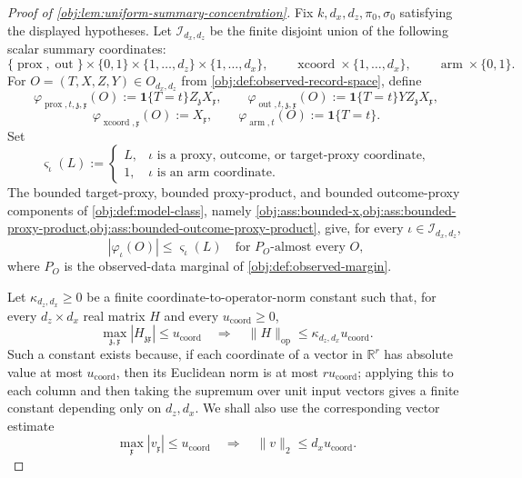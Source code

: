 \begin{proof}[Proof of \cref{obj:lem:uniform-summary-concentration}]
Fix \(k,d_x,d_z,\pi_0,\sigma_0\) satisfying the displayed hypotheses.  Let
\(\mathcal I_{d_x,d_z}\) be the finite disjoint union of the following scalar
summary coordinates:
\[
\{\operatorname{prox},\operatorname{out}\}\times\{0,1\}
\times\{1,\ldots,d_z\}\times\{1,\ldots,d_x\},
\qquad
\operatorname{xcoord}\times\{1,\ldots,d_x\},
\qquad
\operatorname{arm}\times\{0,1\}.
\]
For \(O=(T,X,Z,Y)\in O_{d_x,d_z}\) from
\cref{obj:def:observed-record-space}, define
\[
\varphi_{\operatorname{prox},t,\mathfrak z,\mathfrak x}(O)
:=
\mathbf 1\{T=t\}Z_{\mathfrak z}X_{\mathfrak x},
\qquad
\varphi_{\operatorname{out},t,\mathfrak z,\mathfrak x}(O)
:=
\mathbf 1\{T=t\}YZ_{\mathfrak z}X_{\mathfrak x},
\]
\[
\varphi_{\operatorname{xcoord},\mathfrak x}(O):=X_{\mathfrak x},
\qquad
\varphi_{\operatorname{arm},t}(O):=\mathbf 1\{T=t\}.
\]
Set
\[
\varsigma_{\iota}(L):=
\begin{cases}
L, & \iota\text{ is a proxy, outcome, or target-proxy coordinate},\\
1, & \iota\text{ is an arm coordinate}.
\end{cases}
\]
The bounded target-proxy, bounded proxy-product, and bounded outcome-proxy
components of \cref{obj:def:model-class}, namely
\cref{obj:ass:bounded-x,obj:ass:bounded-proxy-product,obj:ass:bounded-outcome-proxy-product},
give, for every \(\iota\in\mathcal I_{d_x,d_z}\),
\[
|\varphi_\iota(O)|\le \varsigma_\iota(L)
\quad\text{for \(P_O\)-almost every }O,
\]
where \(P_O\) is the observed-data marginal of
\cref{obj:def:observed-margin}.  %

Let \(\kappa_{d_z,d_x}\ge0\) be a finite coordinate-to-operator-norm constant
such that, for every \(d_z\times d_x\) real matrix \(H\) and every
\(u_{\mathrm{coord}}\ge0\),
\[
\max_{\mathfrak z,\mathfrak x}|H_{\mathfrak z\mathfrak x}|
\le u_{\mathrm{coord}}
\quad\Longrightarrow\quad
\|H\|_{\mathrm{op}}\le \kappa_{d_z,d_x}u_{\mathrm{coord}}.
\]
Such a constant exists because, if each coordinate of a vector in
\(\mathbb R^r\) has absolute value at most \(u_{\mathrm{coord}}\), then its
Euclidean norm is at most \(r u_{\mathrm{coord}}\); applying this to each
column and then taking the supremum over unit input vectors gives a finite
constant depending only on \(d_z,d_x\).  We shall also use the corresponding
vector estimate
\[
\max_{\mathfrak x}|v_{\mathfrak x}|\le u_{\mathrm{coord}}
\quad\Longrightarrow\quad
\|v\|_2\le d_xu_{\mathrm{coord}} .
\]  %


\end{proof}
